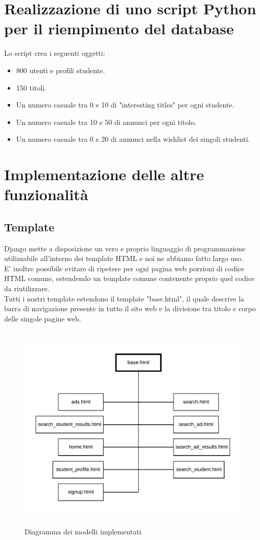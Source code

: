 \documentclass[10pt,a4paper]{report}
\begin{document}
	\section{Realizzazione di uno script Python per il riempimento del database}
	Lo script crea i seguenti oggetti:
	\begin{itemize}
		\item 800 utenti e profili studente.
		\item 150 titoli.
		\item Un numero casuale tra 0 e 10 di "interesting titles" per ogni studente.
		\item Un numero casuale tra 10 e 50 di annunci per ogni titolo.
		\item Un numero casuale tra 0 e 20 di annunci nella wishlist dei singoli studenti.
	\end{itemize}

	\section{Implementazione delle altre funzionalità}
	
	\subsection{Template}
	Django mette a disposizione un vero e proprio linguaggio di programmazione utilizzabile all'interno dei template HTML e noi ne abbiamo fatto largo uso. \\
	E' inoltre possibile evitare di ripetere per ogni pagina web porzioni di codice HTML comune, estendendo un template comune contenente proprio quel codice da riutilizzare. \\
	
	Tutti i nostri template estendono il template "base.html", il quale descrive la barra di navigazione presente in tutto il sito web e la divisione tra titolo e corpo delle singole pagine web.
	
	\begin{figure}[H]
		\centering
		\includegraphics[height=10cm, width=17cm, keepaspectratio]{images/templates.png}
		\caption{Diagramma dei modelli implementati}
	\end{figure}
	
\end{document}
